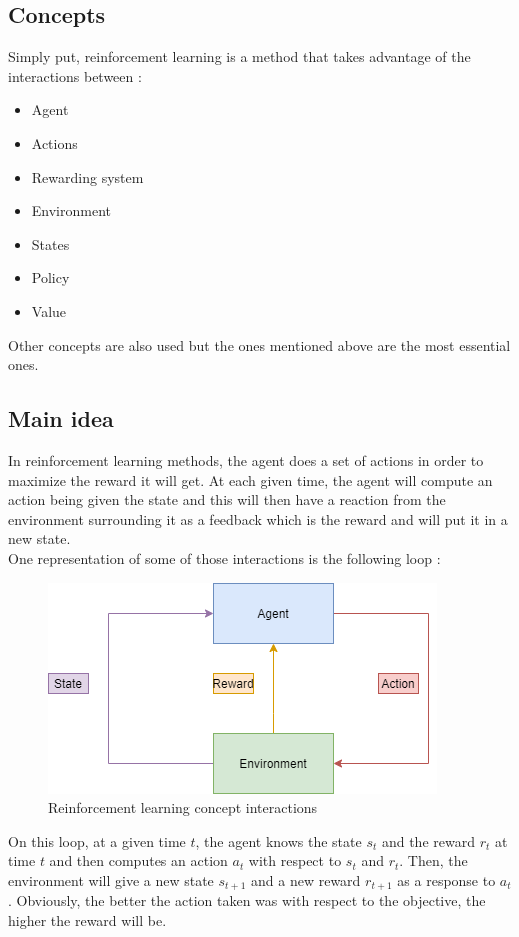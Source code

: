 \documentclass[a4paper,12pt,calibri,oneside,openany]{book}
\theoremstyle{break}
\begin{document}
\subsection{Concepts}
\qquad Simply put, reinforcement learning is a method that takes advantage of the interactions between : 
\begin{itemize}
	\item Agent
	\item Actions
	\item Rewarding system
	\item Environment
	\item States
	\item Policy
	\item Value
\end{itemize}

Other concepts are also used but the ones mentioned above are the most essential ones.\\
\subsection{Main idea}
In reinforcement learning methods, the agent does a set of actions in order to maximize the reward it will get. At each given time, the agent will compute an action being given the state and this will then have a reaction from the environment surrounding it as a feedback which is the reward and will put it in a new state.\\

One representation of some of those interactions is the following loop :
\begin{figure}[H]
	\centering\includegraphics[width=0.6\linewidth]{RLSchema}
	\caption{Reinforcement learning concept interactions}
\end{figure}

On this loop, at a given time $t$, the agent knows the state $s_t$ and the reward $r_t$ at time $t$ and then computes an action $a_t$ with respect to $s_t$ and $r_t$. Then, the environment will give a new state $s_{t+1}$ and a new reward $r_{t+1}$ as a response to $a_t$. Obviously, the better the action taken was with respect to the objective, the higher the reward will be.\\
\end{document}
